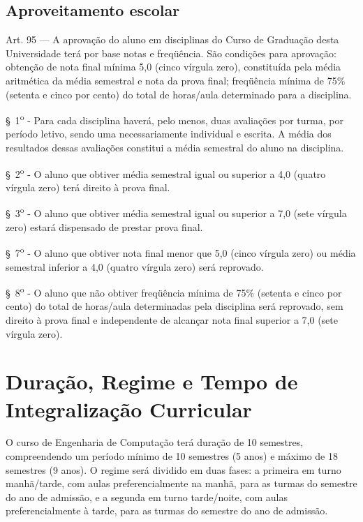 \subsection{Aproveitamento escolar}
\begin{quoting}
    Art. 95 –-- A aprovação do aluno em disciplinas do Curso de Graduação desta Universidade terá por base notas e freqüência. São condições para aprovação: obtenção de nota final mínima 5,0 (cinco vírgula zero), constituída pela média aritmética da média semestral e nota da prova final; freqüência mínima de 75\% (setenta e cinco por cento) do total de horas/aula determinado para a disciplina.


    \S~1\textsuperscript{o} - Para cada disciplina haverá, pelo menos, duas avaliações por turma, por período letivo, sendo uma necessariamente individual e escrita. A média dos resultados dessas avaliações constitui a média semestral do aluno na disciplina.

    \S~2\textsuperscript{o} - O aluno que obtiver média semestral igual ou superior a 4,0 (quatro vírgula zero) terá direito à prova final.

    \S~3\textsuperscript{o} - O aluno que obtiver média semestral igual ou superior a 7,0 (sete vírgula zero) estará dispensado de prestar prova final.

    \S~7\textsuperscript{o} - O aluno que obtiver nota final menor que 5,0 (cinco vírgula zero) ou média semestral inferior a 4,0 (quatro vírgula zero) será reprovado.

    \S~8\textsuperscript{o} - O aluno que não obtiver freqüência mínima de 75\% (setenta e cinco por cento) do total de horas/aula determinadas pela disciplina será reprovado, sem direito à prova final e independente de alcançar nota final superior a 7,0 (sete vírgula zero).
\end{quoting}

\section{Duração, Regime e Tempo de Integralização Curricular}

O curso de Engenharia de Computação terá duração de 10 semestres, compreendendo um período mínimo de 10 semestres (5 anos) e máximo de 18 semestres (9 anos). O regime será dividido em duas fases: a primeira em turno manhã/tarde, com aulas preferencialmente na manhã, para as turmas do  semestre do ano de admissão, e a segunda em turno tarde/noite, com aulas preferencialmente à tarde, para as turmas do  semestre do ano de admissão.

